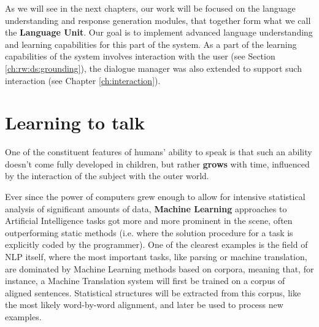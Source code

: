 As we will see in the next chapters, our work will be focused on the language understanding and response generation modules, that together form what we call the \textbf{Language Unit}. Our goal is to implement advanced language understanding and learning capabilities for this part of the system. As a part of the learning capabilities of the system involves interaction with the user (see Section \ref{ch:rw:ds:grounding}), the dialogue manager was also extended to support such interaction (see Chapter \ref{ch:interaction}).



\section{Learning to talk}

One of the constituent features of humans' ability to speak is that such an ability doesn't come fully developed in children, but rather \textbf{grows} with time, influenced by the interaction of the subject with the outer world.

Ever since the power of computers grew enough to allow for intensive statistical analysis of significant amounts of data, \textbf{Machine Learning} approaches to Artificial Intelligence tasks got more and more prominent in the scene, often outperforming static methods (i.e. where the solution procedure for a task is explicitly coded by the programmer).
One of the clearest examples is the field of NLP itself, where the most important tasks, like parsing or machine translation, are dominated by Machine Learning methods based on corpora,
meaning that, for instance, a Machine Translation system will first be trained on a corpus of aligned sentences. Statistical structures will be extracted from this corpus, like the most likely word-by-word alignment, and later be used to process new examples.

